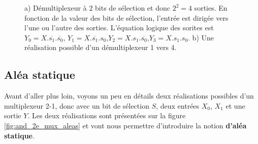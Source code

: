 \begin{figure}[htbp]
\begin{minipage}[c]{.46\linewidth}
   \end{minipage}
\caption{\label{fig:demux} a) Démultiplexeur à $2$ bits de sélection et donc $2^2 = 4$ sorties. En fonction de la valeur des bits de sélection, l'entrée est dirigée vers l'une ou l'autre des sorties. L'équation logique des sorites est $Y_0 = X.\overline{s_1}.\overline{s_0}$, $Y_1 = X.\overline{s_1}.s_0$,$Y_2 = X.s_1.\overline{s_0}$,$Y_3 = X.s_1.s_0$. b) Une réalisation possible d'un démultiplexeur 1 vers 4.}
\end{figure}


\subsection{Aléa statique}

Avant d'aller plus loin, voyons un peu en détails deux réalisations possibles d'un multiplexeur 2-1, donc avec un bit de sélection $S$, deux entrées $X_0$, $X_1$ et une sortie $Y$. Les deux réalisations sont présentées sur la figure \ref{fig:and_2e_mux_aleas} et vont nous permettre d'introduire la notion \textbf{d'aléa statique}.

